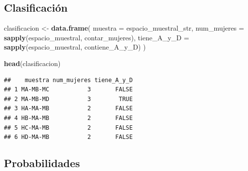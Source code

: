 \documentclass[
]{article}
\newenvironment{Shaded}{\begin{snugshade}}{\end{snugshade}}
\newcommand{\AttributeTok}[1]{\textcolor[rgb]{0.13,0.29,0.53}{#1}}
\newcommand{\DecValTok}[1]{\textcolor[rgb]{0.00,0.00,0.81}{#1}}
\newcommand{\FunctionTok}[1]{\textcolor[rgb]{0.13,0.29,0.53}{\textbf{#1}}}
\newcommand{\NormalTok}[1]{#1}
\newcommand{\OtherTok}[1]{\textcolor[rgb]{0.56,0.35,0.01}{#1}}
\newcommand{\SpecialCharTok}[1]{\textcolor[rgb]{0.81,0.36,0.00}{\textbf{#1}}}
\begin{document}
\subsection{Clasificación}\label{clasificaciuxf3n}

\begin{Shaded}
\begin{Highlighting}[]
\NormalTok{clasificacion }\OtherTok{\textless{}{-}} \FunctionTok{data.frame}\NormalTok{(}
  \AttributeTok{muestra =}\NormalTok{ espacio\_muestral\_str,}
  \AttributeTok{num\_mujeres =} \FunctionTok{sapply}\NormalTok{(espacio\_muestral, contar\_mujeres),}
  \AttributeTok{tiene\_A\_y\_D =} \FunctionTok{sapply}\NormalTok{(espacio\_muestral, contiene\_A\_y\_D)}
\NormalTok{)}

\FunctionTok{head}\NormalTok{(clasificacion)}
\end{Highlighting}
\end{Shaded}

\begin{verbatim}
##    muestra num_mujeres tiene_A_y_D
## 1 MA-MB-MC           3       FALSE
## 2 MA-MB-MD           3        TRUE
## 3 HA-MA-MB           2       FALSE
## 4 HB-MA-MB           2       FALSE
## 5 HC-MA-MB           2       FALSE
## 6 HD-MA-MB           2       FALSE
\end{verbatim}

\subsection{Probabilidades}\label{probabilidades}

\begin{Shaded}
\end{Shaded}
\end{document}
